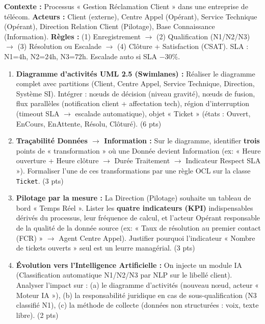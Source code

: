 \documentclass[11pt]{article}
\begin{document}
\begin{exercice}
\textbf{Contexte :} Processus « Gestion Réclamation Client » dans une entreprise de télécom. 
\textbf{Acteurs :} Client (externe), Centre Appel (Opérant), Service Technique (Opérant), Direction Relation Client (Pilotage), Base Connaissance (Information).
\textbf{Règles :} (1) Enregistrement $\to$ (2) Qualification (N1/N2/N3) $\to$ (3) Résolution ou Escalade $\to$ (4) Clôture + Satisfaction (CSAT). SLA : N1=$4$h, N2=$24$h, N3=$72$h. Escalade auto si SLA $-30\%$.
\begin{enumerate}
    \item \textbf{Diagramme d'activités UML 2.5 (Swimlanes) :} Réaliser le diagramme complet avec partitions (Client, Centre Appel, Service Technique, Direction, Système SI). Intégrer : nœuds de décision (niveau gravité), nœuds de fusion, flux parallèles (notification client + affectation tech), région d'interruption (timeout SLA $\to$ escalade automatique), objet « Ticket » (états : Ouvert, EnCours, EnAttente, Résolu, Clôturé). (6 pts)
    \item \textbf{Traçabilité Données $\to$ Information :} Sur le diagramme, identifier \textbf{trois} points de « transformation » où une Donnée devient Information (ex: « Heure ouverture + Heure clôture $\to$ Durée Traitement $\to$ Indicateur Respect SLA »). Formaliser l'une de ces transformations par une règle OCL sur la classe \texttt{Ticket}. (3 pts)
    \item \textbf{Pilotage par la mesure :} La Direction (Pilotage) souhaite un tableau de bord « Temps Réel ». Lister les \textbf{quatre indicateurs (KPI)} indispensables dérivés du processus, leur fréquence de calcul, et l'acteur Opérant responsable de la qualité de la donnée source (ex: « Taux de résolution au premier contact (FCR) » $\to$ Agent Centre Appel). Justifier pourquoi l'indicateur « Nombre de tickets ouverts » seul est un leurre managérial. (3 pts)
    \item \textbf{Évolution vers l'Intelligence Artificielle :} On injecte un module IA (Classification automatique N1/N2/N3 par NLP sur le libellé client). Analyser l'impact sur : (a) le diagramme d'activités (nouveau nœud, acteur « Moteur IA »), (b) la responsabilité juridique en cas de sous-qualification (N3 classifié N1), (c) la méthode de collecte (données non structurées : voix, texte libre). (2 pts)
\end{enumerate}
\end{exercice}
\end{document}
